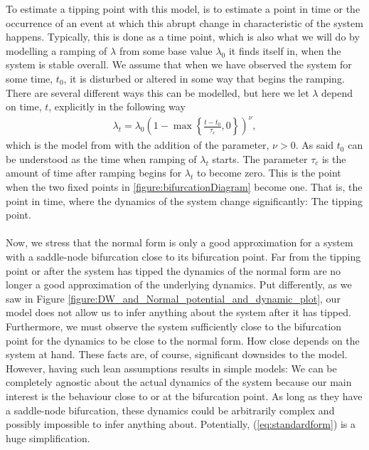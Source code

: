 To estimate a tipping point with this model, is to estimate a point in time or the occurrence of an event at which this abrupt change in characteristic of the system happens. Typically, this is done as a time point, which is also what we will do by modelling a ramping of $\lambda$ from some base value $\lambda_0$ it finds itself in, when the system is stable overall. We assume that when we have observed the system for some time, $t_0$, it is disturbed or altered in some way that begins the ramping. There are several different ways this can be modelled, but here we let $\lambda$ depend on time, $t$, explicitly in the following way
\begin{align}
    \lambda_t = \lambda_0\left(1 - \max\left\{\frac{t - t_0}{\tau_c},0\right\}\right)^\nu, \label{eq:lambdaRampDefinition}
\end{align} 
which is the model from \cite[equation (2)]{Ditlevsen2023} with the addition of the parameter, $\nu>0$. As said $t_0$ can be understood as the time when ramping of $\lambda_t$ starts. The parameter $\tau_c$ is the amount of time after ramping begins for $\lambda_t$ to become zero. This is the point when the two fixed points in \ref{figure:bifurcationDiagram} become one. That is, the point in time, where the dynamics of the system change significantly: The tipping point. \\\\
Now, we stress that the normal form is only a good approximation for a system with a saddle-node bifurcation close to its bifurcation point. Far from the tipping point or after the system has tipped the dynamics of the normal form are no longer a good approximation of the underlying dynamics. Put differently, as we saw in Figure \ref{figure:DW_and_Normal_potential_and_dynamic_plot}, our model does not allow us to infer anything about the system after it has tipped. Furthermore, we must observe the system sufficiently close to the bifurcation point for the dynamics to be close to the normal form. How close depends on the system at hand. These facts are, of course, significant downsides to the model. However, having such lean assumptions results in simple models: We can be completely agnostic about the actual dynamics of the system because our main interest is the behaviour close to or at the bifurcation point. As long as they have a saddle-node bifurcation, these dynamics could be arbitrarily complex and possibly impossible to infer anything about. Potentially, (\ref{eq:standardform}) is a huge simplification.
